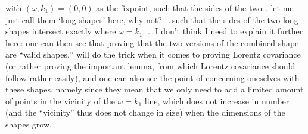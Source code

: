 \documentclass{report}
\begin{document}
with $(\omega, k_1)=(0,0)$ as the fixpoint, such that the sides of the two.\,. let me just call them `long-shapes' here, why not? .\,.\,such that the sides of the two long-shapes intersect exactly where $\omega = k_1$. .\,.\,I don't think I need to explain it further here: one can then see that proving that the two versions of the combined shape are ``valid shapes,'' will do the trick when it comes to proving Lorentz covariance (or rather proving the important lemma, from which Lorentz covariance should follow rather easily), and one can also see the point of concerning oneselves with these shapes, namely since they mean that we only need to add a limited amount of points in the vicinity of the $\omega=k_1$ line, which does not increase in number (and the ``vicinity'' thus does not change in size) when the dimensions of the shapes grow. 
\end{document}
